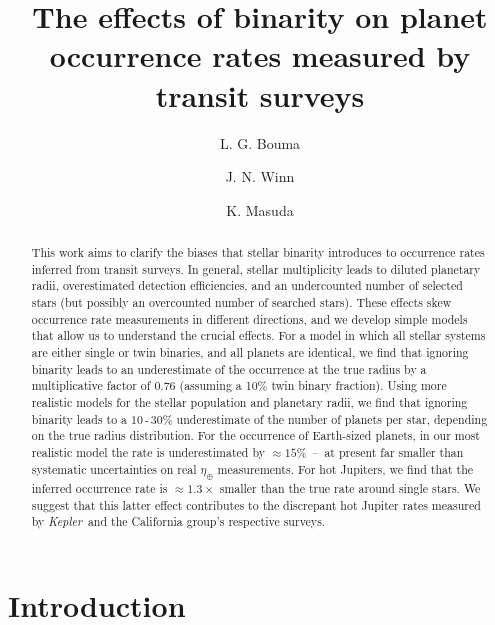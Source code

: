 \documentclass[12pt,modern]{aastex61}
\begin{document}
    
\title{ The effects of binarity on planet occurrence rates measured by transit 
surveys}
%
%
\author{L. G. Bouma}
\author{J. N. Winn}
\author{K. Masuda}
%
%
\begin{abstract}
%
This work aims to clarify the biases that stellar binarity introduces
to occurrence rates inferred from transit surveys.
In general, stellar multiplicity leads to diluted planetary 
radii, overestimated detection efficiencies, and an undercounted number of 
selected stars (but possibly an overcounted number of searched stars).
These effects skew occurrence rate measurements in different directions, and 
we develop simple models that allow us to understand the crucial effects.
For a model in which all stellar systems are either single or twin binaries, 
and all planets are identical, we find that ignoring binarity leads to an 
underestimate of the occurrence at the true radius by a multiplicative factor 
of $0.76$ (assuming a 10\% twin binary fraction).
Using more realistic models for the stellar population and planetary 
radii, we find that ignoring binarity leads to a $10$\,-\,$30\%$ 
underestimate of the number of planets per star, depending on the true radius 
distribution.
For the occurrence of Earth-sized planets, in our most realistic model the 
rate is underestimated by $\approx 15\%$~--~at present far smaller than 
systematic uncertainties on real $\eta_\oplus$ measurements.
For hot Jupiters, we find that the inferred occurrence rate is 
$\approx 1.3\times$ smaller than the true rate around single stars.
We suggest that this latter effect contributes to the discrepant hot Jupiter 
rates measured by {\it Kepler}\ and the California group's respective surveys.
%
\end{abstract}
%
%
%

%

\section{Introduction}
\end{document}
